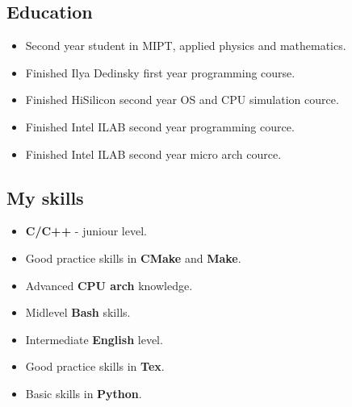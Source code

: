 \begin{minipage}[t]{12cm}
\subsection* {Education}
\begin{itemize}
    \item Second year student in MIPT, applied physics and mathematics.
    \item Finished Ilya Dedinsky first year programming course.
    \item Finished HiSilicon second year OS and CPU simulation cource.
    \item Finished Intel ILAB second year programming cource.
    \item Finished Intel ILAB second year micro arch cource.
\end{itemize}

\end{minipage}
\begin{minipage}[t]{6.5cm}

\subsection* {My skills}
\begin{itemize}
    \item \textbf{C/C++} - juniour level. \\

    \item Good practice skills in \textbf{CMake} and \textbf{Make}. \\

    \item Advanced \textbf{CPU arch} knowledge. \\

    \item Midlevel \textbf{Bash} skills. \\

    \item Intermediate \textbf{English} level. \\

    \item Good practice skills in \textbf{Tex}. \\

    \item Basic skills in \textbf{Python}. \\

\end{itemize}

\end{minipage}

